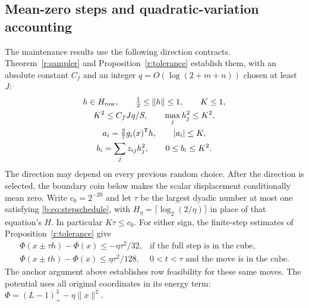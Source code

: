 \documentclass[11pt]{amsart}
\theoremstyle{definition}\newtheorem{definition}[theorem]{Definition}
\theoremstyle{remark}\newtheorem{remark}[theorem]{Remark}
\numberwithin{equation}{section}
\begin{document}
\subsection{Mean-zero steps and quadratic-variation accounting}
\label{m:sec:contracts}
The maintenance results use the following direction contracts.
Theorem~\ref{r:sampler} and Proposition~\ref{r:tolerance} establish them, with
an absolute constant $C_f$ and an integer
$q=O(\log(2+m+n))$ chosen at least $J$:
\begin{equation}
 \begin{gathered}
 h\in H_{\rm row},\qquad \tfrac12\le\|h\|\le1,\qquad K\le1,\\
 K^2\le C_fJq/S,\qquad \max_jh_j^2\le K^2,\\
 a_i=\tfrac27g_i(x)^{\mathsf T}h,\qquad |a_i|\le K,\\
 b_i=\sum_jz_{ij}h_j^2,\qquad 0\le b_i\le K^2.
 \end{gathered}                                             \label{m:eq:contracts}
\end{equation}
The direction may depend on every previous random choice. After the direction is selected, the boundary coin below makes the scalar
displacement conditionally mean zero. Write $c_0=2^{-20}$ and let $\tau$ be the largest dyadic
number at most one satisfying \eqref{b:eq:stepschedule}, with
$H_\eta=\lceil\log_2(2/\eta)\rceil$ in place of that equation's $H$.
In particular $K\tau\le c_0$. For either sign, the finite-step estimates
of Proposition~\ref{r:tolerance} give
\begin{equation}
 \begin{array}{ll}
 \Phi(x\pm\tau h)-\Phi(x)\le-\eta\tau^2/32,
       &\text{if the full step is in the cube},\\[1mm]
 \Phi(x\pm th)-\Phi(x)\le\eta\tau^2/128,
       &0<t<\tau\text{ and the move is in the cube}.
 \end{array}                                                \label{m:eq:two-sided}
\end{equation}
The anchor argument above establishes row feasibility for these same
moves. The potential uses all original coordinates in its energy term:
$\Phi=(L-1)_+^3-\eta\|x\|^2$.
\end{document}
